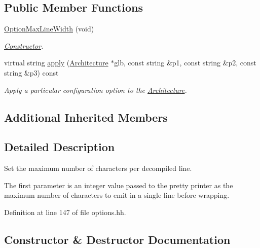 \subsection*{Public Member Functions}
\begin{DoxyCompactItemize}
\item 
\mbox{\hyperlink{class_option_max_line_width_a1c7526e9540d67a4cdce5e8f6da7d6cd}{Option\+Max\+Line\+Width}} (void)
\begin{DoxyCompactList}\small\item\em \mbox{\hyperlink{class_constructor}{Constructor}}. \end{DoxyCompactList}\item 
virtual string \mbox{\hyperlink{class_option_max_line_width_a07c124f2e4fb139ae10e94033b0ed232}{apply}} (\mbox{\hyperlink{class_architecture}{Architecture}} $\ast$glb, const string \&p1, const string \&p2, const string \&p3) const
\begin{DoxyCompactList}\small\item\em Apply a particular configuration option to the \mbox{\hyperlink{class_architecture}{Architecture}}. \end{DoxyCompactList}\end{DoxyCompactItemize}
\subsection*{Additional Inherited Members}


\subsection{Detailed Description}
Set the maximum number of characters per decompiled line. 

The first parameter is an integer value passed to the pretty printer as the maximum number of characters to emit in a single line before wrapping. 

Definition at line 147 of file options.\+hh.



\subsection{Constructor \& Destructor Documentation}
\mbox{\label{class_option_max_line_width_a1c7526e9540d67a4cdce5e8f6da7d6cd}} 
